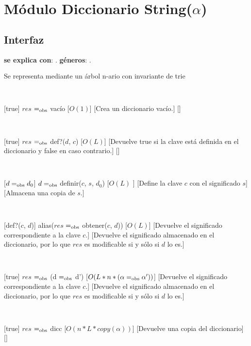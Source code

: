 \section{Módulo Diccionario String($\alpha$)}

\subsection{Interfaz}

\textbf{se explica con}: .
\textbf{géneros}: .

Se representa mediante un árbol n-ario con invariante de trie

~

%
[true]
{$res$ $=_{\mathrm{obs}}$ vacío}
[$O(1)$]
[Crea un diccionario vacío.]
[]

~

[true]
{$res$ $=_{\mathrm{obs}}$ def?($d$, $c$)}
[$O(L)$]
[Devuelve true si la clave está definida en el diccionario y false en caso contrario.]
[]

~

[$ d =_{\mathrm{obs}} d_0 $]
{$ d =_{\mathrm{obs}}$ definir($c$, $s$, $d_0$)}
[$O(L)$ ]
[Define la clave $c$ con el significado $s$]
[Almacena una copia de $s$.]

~

[def?($c$, $d$)]
{alias($res$ $=_{\mathrm{obs}}$ obtener($c$, $d$))}
[$O(L)$]
[Devuelve el significado correspondiente a la clave $c$.]
[Devuelve el significado almacenado en el diccionario, por lo que $res$ es modificable si y sólo si $d$ lo es.]

~

[true]
{$res$ $=_{\mathrm{obs}}$ (d $=_{\mathrm{obs}}$ d')}
[$O(L*n*(\alpha  =_{\mathrm{obs}} \alpha'))$]
[Devuelve el significado correspondiente a la clave $c$.]
[Devuelve el significado almacenado en el diccionario, por lo que $res$ es modificable si y sólo si $d$ lo es.]

~

[true]
{$res$ $=_{\mathrm{obs}}$ dicc}
[$O(n * L * copy(\alpha))$]
[Devuelve una copia del diccionario]
[]

